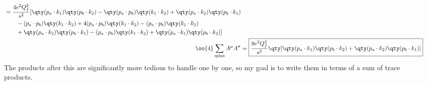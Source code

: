 \begin{align}
		\\
		\begin{split}
			&=\frac{4e^2Q_f^2}{s^2}
			[ 
				\qty(p_a\cdot k_1)\qty(p_b\cdot k_2)
				-\qty(p_a\cdot p_b)\qty(k_1\cdot k_2)
				+\qty(p_a\cdot k_2)\qty(p_b\cdot k_1)
				\\&\qquad
				-(p_a\cdot p_b)\qty(k_1\cdot k_2)
				+4(p_a\cdot p_b)\qty(k_1\cdot k_2)
				-(p_a\cdot p_b)\qty(k_1\cdot k_2)
				\\&\qquad
				+\qty(p_a\cdot k_2)\qty(p_b \cdot k_1)
				-(p_a\cdot p_b)\qty(k_1\cdot k_2)
				+\qty(p_a\cdot k_1)\qty(p_b\cdot k_2)
				]
		\end{split}
		\\
		\oo{4}\sum_\text{spins}A^\mu A^\sigma&=\boxed{\frac{8e^2Q_f^2}{s^2}\qty[\qty(p_a\cdot k_1)\qty(p_b\cdot k_2)
		+\qty(p_a\cdot k_2)\qty(p_b \cdot k_1)]}\label{eqn:AmAs_result}
	\end{align}
The products after this are significantly more tedious to handle one by one, so my goal is to write them in terms of a sum of trace products.
\newpage
